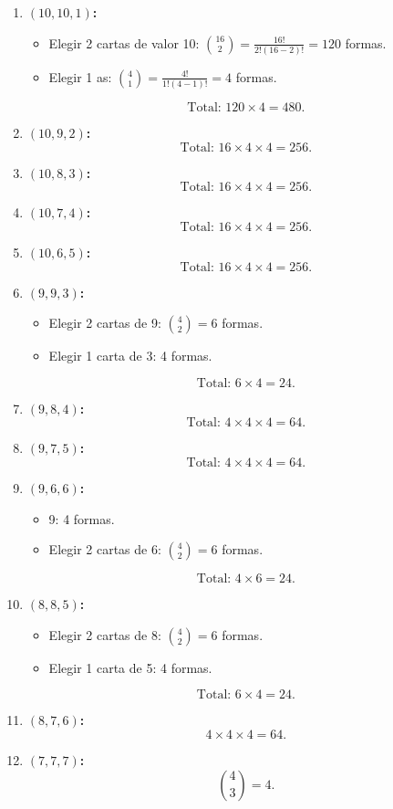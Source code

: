 \documentclass[a4paper,12pt]{article}
\begin{document}
	
	\begin{enumerate}
		\item \textbf{$(10, 10, 1)$:}
		\begin{itemize}
			\item Elegir 2 cartas de valor 10: $\displaystyle \binom{16}{2} = \frac{16!}{2!(16-2)!} = 120$ formas.
			\item Elegir 1 as: $\displaystyle \binom{4}{1} = \frac{4!}{1!(4-1)!} = 4$ formas.
		\end{itemize}
		
		\[
		\text{Total: } 120 \times 4 = 480.
		\]
		\item \textbf{$(10, 9, 2)$:}
		\[
		\text{Total: } 16 \times 4 \times 4 = 256.
		\]
		
		\item \textbf{$(10, 8, 3)$:}
		\[
		\text{Total: } 16 \times 4 \times 4 = 256.
		\]
		
		\item \textbf{$(10, 7, 4)$:}
		\[
		\text{Total: } 16 \times 4 \times 4 = 256.
		\]
		
		\item \textbf{$(10, 6, 5)$:}
		\[
		\text{Total: } 16 \times 4 \times 4 = 256.
		\]
		
		\item \textbf{$(9, 9, 3)$:}
		\begin{itemize}
			\item Elegir 2 cartas de 9: $\displaystyle \binom{4}{2} = 6$ formas.
			\item Elegir 1 carta de 3: 4 formas.
		\end{itemize}
		\[
		\text{Total: } 6 \times 4 = 24.
		\]
		
		\item \textbf{$(9, 8, 4)$:}
		\[
		\text{Total: } 4 \times 4 \times 4 = 64.
		\]
		
		\item \textbf{$(9, 7, 5)$:}
		\[
		\text{Total: } 4 \times 4 \times 4 = 64.
		\]
		
		\item \textbf{$(9, 6, 6)$:}
		\begin{itemize}
			\item 9: 4 formas.
			\item Elegir 2 cartas de 6: $\displaystyle \binom{4}{2} = 6$ formas.
		\end{itemize}
		\[
		\text{Total: } 4 \times 6 = 24.
		\]
		
		\item \textbf{$(8, 8, 5)$:}
		\begin{itemize}
			\item Elegir 2 cartas de 8: $\displaystyle \binom{4}{2} = 6$ formas.
			\item Elegir 1 carta de 5: 4 formas.
		\end{itemize}
		\[
		\text{Total: } 6 \times 4 = 24.
		\]
		
		\item \textbf{$(8, 7, 6)$:}
		\[
		4 \times 4 \times 4 = 64.
		\]
		
		\item \textbf{$(7, 7, 7)$:}
		\[
		\binom{4}{3} = 4.
		\]
	\end{enumerate}
	
\end{document}
